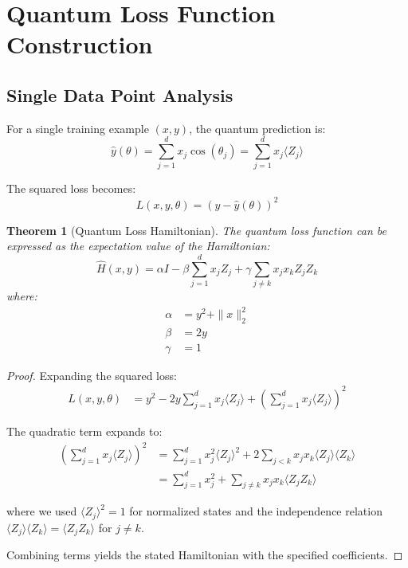 \documentclass[11pt]{article}
\newtheorem{theorem}{Theorem}[section]
\begin{document}
\section{Quantum Loss Function Construction}

\subsection{Single Data Point Analysis}

For a single training example $(x, y)$, the quantum prediction is:
\begin{equation}
\hat{y}(\theta) = \sum_{j=1}^d x_j \cos(\theta_j) = \sum_{j=1}^d x_j \langle Z_j \rangle
\label{eq:quantum_prediction}
\end{equation}

The squared loss becomes:
\begin{equation}
L(x, y, \theta) = (y - \hat{y}(\theta))^2
\label{eq:single_loss}
\end{equation}

\begin{theorem}[Quantum Loss Hamiltonian]
The quantum loss function can be expressed as the expectation value of the Hamiltonian:
\begin{equation}
\hat{H}(x, y) = \alpha I - \beta \sum_{j=1}^d x_j Z_j + \gamma \sum_{j \neq k} x_j x_k Z_j Z_k
\label{eq:loss_hamiltonian}
\end{equation}
where:
\begin{align}
\alpha &= y^2 + \|x\|_2^2 \\
\beta &= 2y \\
\gamma &= 1
\end{align}
\end{theorem}

\begin{proof}
Expanding the squared loss:
\begin{align}
L(x, y, \theta) &= y^2 - 2y \sum_{j=1}^d x_j \langle Z_j \rangle + \left(\sum_{j=1}^d x_j \langle Z_j \rangle\right)^2
\end{align}

The quadratic term expands to:
\begin{align}
\left(\sum_{j=1}^d x_j \langle Z_j \rangle\right)^2 &= \sum_{j=1}^d x_j^2 \langle Z_j \rangle^2 + 2\sum_{j<k} x_j x_k \langle Z_j \rangle \langle Z_k \rangle \\
&= \sum_{j=1}^d x_j^2 + \sum_{j \neq k} x_j x_k \langle Z_j Z_k \rangle
\end{align}

where we used $\langle Z_j \rangle^2 = 1$ for normalized states and the independence relation $\langle Z_j \rangle \langle Z_k \rangle = \langle Z_j Z_k \rangle$ for $j \neq k$.

Combining terms yields the stated Hamiltonian with the specified coefficients.
\end{proof}
\end{document}
